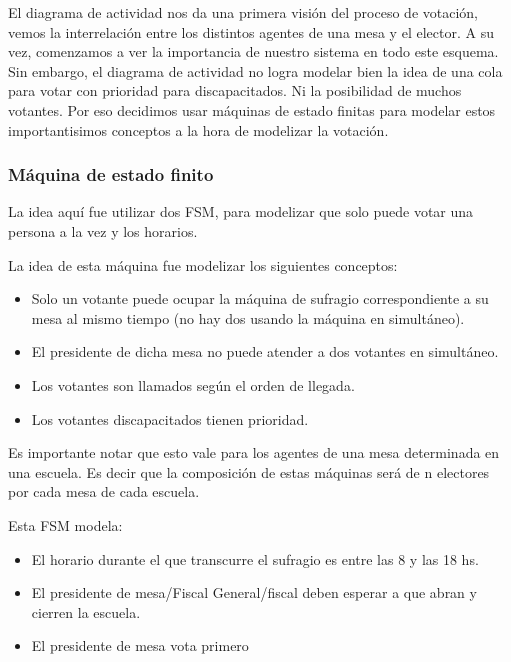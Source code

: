El diagrama de actividad nos da una primera visión del proceso de votación, vemos la interrelación entre los distintos agentes de una mesa y el elector. A su vez, comenzamos a ver la importancia de nuestro sistema en todo este esquema. Sin embargo, el diagrama de actividad no logra modelar bien la idea de una cola para votar con prioridad para discapacitados. Ni la posibilidad de muchos votantes. Por eso decidimos usar máquinas de estado finitas para modelar estos importantisimos conceptos a la hora de modelizar la votación.

\subsubsection{Máquina de estado finito}

La idea aquí fue utilizar dos FSM, para modelizar que solo puede votar una persona a la vez y los horarios.

\begin{figure}[H]
\centering
\end{figure}

La idea de esta máquina fue modelizar los siguientes conceptos:
\begin{itemize}
\item Solo un votante puede ocupar la máquina de sufragio correspondiente a su mesa al mismo tiempo (no hay dos usando la máquina en simultáneo).
\item El presidente de dicha mesa no puede atender a dos votantes en simultáneo.
\item Los votantes son llamados según el orden de llegada.
\item Los votantes discapacitados tienen prioridad.

\end{itemize}

Es importante notar que esto vale para los agentes de una mesa determinada en una escuela. Es decir que la composición de estas máquinas será de n electores por cada mesa de cada escuela.

\begin{figure}[H]
\centering
\end{figure}

Esta FSM modela:
\begin{itemize}
\item El horario durante el que transcurre el sufragio es entre las 8 y las 18 hs.
\item El presidente de mesa/Fiscal General/fiscal deben esperar a que abran y cierren la escuela.
\item El presidente de mesa vota primero

\end{itemize}

